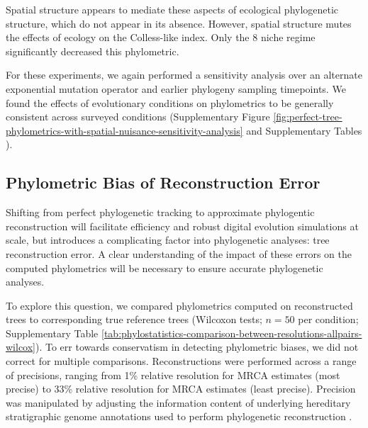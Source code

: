 Spatial structure appears to mediate these aspects of ecological phylogenetic structure, which do not appear in its absence.
However, spatial structure mutes the effects of ecology on the Colless-like index.
Only the 8 niche regime significantly decreased this phylometric.

For these experiments, we again performed a sensitivity analysis over an alternate exponential mutation operator and earlier phylogeny sampling timepoints.
We found the effects of evolutionary conditions on phylometrics to be generally consistent across surveyed conditions (Supplementary Figure \ref{fig:perfect-tree-phylometrics-with-spatial-nuisance-sensitivity-analysis} and Supplementary Tables ).

\subsection{Phylometric Bias of Reconstruction Error}
\label{sec:phylometric-bias-reconstruction-error}

Shifting from perfect phylogenetic tracking to approximate phylogentic reconstruction will facilitate efficiency and robust digital evolution simulations at scale, but introduces a complicating factor into phylogenetic analyses: tree reconstruction error.
A clear understanding of the impact of these errors on the computed phylometrics will be necessary to ensure accurate phylogenetic analyses.

To explore this question, we compared phylometrics computed on reconstructed trees to corresponding true reference trees (Wilcoxon tests; $n=50$ per condition; Supplementary Table \ref{tab:phylostatistics-comparison-between-resolutions-allpairs-wilcox}).
To err towards conservatism in detecting phylometric biases, we did not correct for multiple comparisons.
Reconstructions were performed across a range of precisions, ranging from 1\% relative resolution for MRCA estimates (most precise) to 33\% relative resolution for MRCA estimates (least precise).
Precision was manipulated by adjusting the information content of underlying hereditary stratigraphic genome annotations used to perform phylogenetic reconstruction \citep{moreno2022hereditary}.




